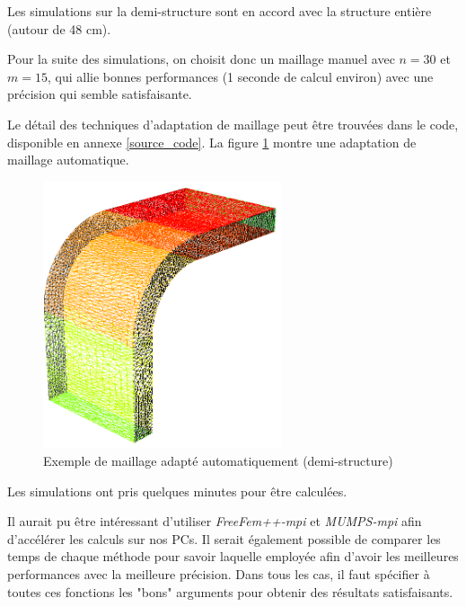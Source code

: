     Les simulations sur la demi-structure sont en accord avec la structure entière (autour de 48 cm).

    Pour la suite des simulations, on choisit donc un maillage manuel avec $n=30$ et $m=15$, qui allie bonnes performances (1 seconde de calcul environ) avec une précision qui semble satisfaisante.
    
    Le détail des techniques d'adaptation de maillage peut être trouvées dans le code, disponible en annexe \ref{source_code}.
    La figure \ref{fig:maillage_auto} montre une adaptation de maillage automatique.
    
    \begin{figure}        
        \begin{center}
        
            \includegraphics[width=7cm]{imgs/half_maillage_auto.PNG}
            \caption{Exemple de maillage adapté automatiquement (demi-structure)}
            \label{fig:maillage_auto}
        
        \end{center}
    \end{figure}

    Les simulations ont pris quelques minutes pour être calculées. 

    Il aurait pu être intéressant d'utiliser \emph{FreeFem++-mpi} et \emph{MUMPS-mpi} afin d'accélérer les calculs sur nos PCs.
    Il serait également possible de comparer les temps de chaque méthode pour savoir laquelle employée afin d'avoir les meilleures performances avec la meilleure précision.
    Dans tous les cas, il faut spécifier à toutes ces fonctions les "bons" arguments pour obtenir des résultats satisfaisants.








